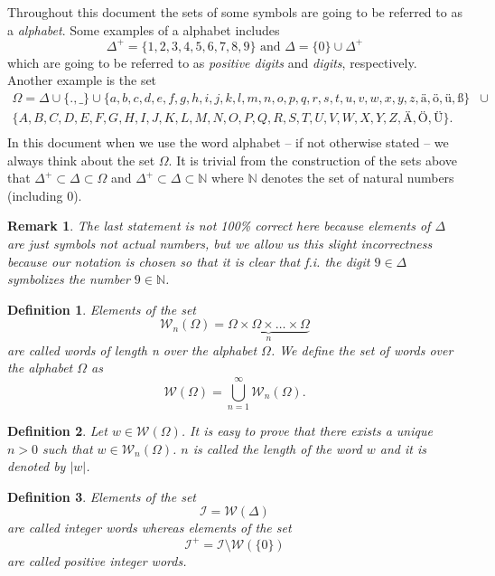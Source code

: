 \documentclass{scrartcl}
\newtheorem{mydef}{Definition}
\newtheorem{remark}{Remark}
\begin{document}
Throughout this document the sets of some symbols are going to be referred to as a \emph{alphabet}. Some examples of a alphabet includes
$$\Delta^+=\{1,2,3,4,5,6,7,8,9\} \mbox{ and }\Delta=\{0\}\cup\Delta^+$$
which are going to be referred to as \emph{positive digits} and \emph{digits}, respectively. Another example is the set 
\begin{equation}
\begin{split}
\Omega=\Delta \cup \{.,\_\}\cup\{a,b,c,d,e,f,g,h,i,j,k,l,m,n,o,p,q,r,s,t,u,v,w,x,y,z,ä,ö,ü,ß\} & \cup\\
\{A,B,C,D,E,F,G,H,I,J,K,L,M,N,O,P,Q,R,S,T,U,V,W,X,Y,Z,Ä,Ö,Ü\}. & \\
\end{split}
\end{equation}
In this document when we use the word alphabet -- if not otherwise stated -- we always think about the set $\Omega$. It is trivial from the construction of the sets above that $\Delta^+\subset\Delta\subset\Omega$ and $\Delta^+\subset\Delta\subset\mathbb{N}$ where $\mathbb{N}$ denotes the set of natural numbers (including 0).

\begin{remark}
The last statement is not 100\% correct here because elements of $\Delta$ are just symbols not actual numbers, but we allow us this slight incorrectness because our notation is chosen so that it is clear that f.i. the digit $9\in\Delta$ symbolizes the number $9\in\mathbb{N}$.
\end{remark}
 
\begin{mydef}
Elements of the set $$\mathcal{W}_n(\Omega)=\underbrace{\Omega\times \Omega\times\ldots \times \Omega}_{n}$$ are called \emph{words of length n over the alphabet $\Omega$}. We define the \emph{set of words over the alphabet $\Omega$} as $$\mathcal{W}(\Omega)=\bigcup_{n=1}^{\infty}\mathcal{W}_n(\Omega).$$
\end{mydef}

\begin{mydef}
Let $w\in\mathcal{W}({\Omega})$. It is easy to prove that there exists a unique $n>0$ such that $w\in\mathcal{W}_n({\Omega})$. $n$ is called the \emph{length} of the word $w$ and it is denoted by $|w|$.
\end{mydef}

\begin{mydef} 
Elements of the set
$$\mathcal{I}=\mathcal{W}(\Delta)$$
are called \emph{integer words} whereas elements of the set
$$\mathcal{I}^+=\mathcal{I}\setminus\mathcal{W}(\{0\})$$ are called \emph{positive integer words}.
\end{mydef}
\end{document}
